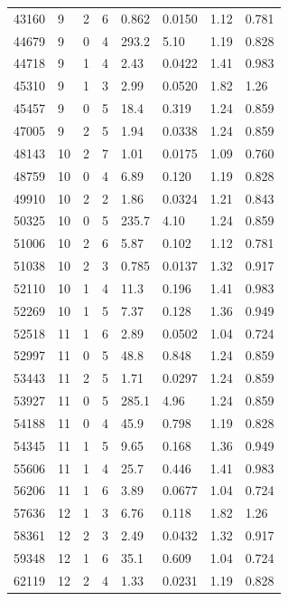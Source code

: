 \documentclass[preview]{standalone}
\begin{document}
{{{\begin{tabular}{L{1.2cm}C{1.2cm} C{0.3cm}C{0.5cm} C{1.4cm}C{1.4cm} C{1.4cm}C{1.4cm}}
  43160  &     9  & 2     &  6 &  0.862  & 0.0150  & 1.12 &  0.781   \\ 
  44679  &     9  & 0     &  4 &  293.2  & 5.10  & 1.19 &  0.828   \\ 
  44718  &     9  & 1     &  4 &  2.43  & 0.0422  & 1.41 &  0.983   \\ 
  45310  &     9  & 1     &  3 &  2.99  & 0.0520  & 1.82 &  1.26   \\ 
  45457  &     9  & 0     &  5 &  18.4  & 0.319  & 1.24 &  0.859   \\ 
  47005  &     9  & 2     &  5 &  1.94  & 0.0338  & 1.24 &  0.859   \\ 
  48143  &    10  & 2     &  7 &  1.01  & 0.0175  & 1.09 &  0.760   \\ 
  48759  &    10  & 0     &  4 &  6.89  & 0.120  & 1.19 &  0.828   \\ 
  49910  &    10  & 2     &  2 &  1.86  & 0.0324  & 1.21 &  0.843   \\ 
  50325  &    10  & 0     &  5 &  235.7  & 4.10  & 1.24 &  0.859   \\ 
  51006  &    10  & 2     &  6 &  5.87  & 0.102  & 1.12 &  0.781   \\ 
  51038  &    10  & 2     &  3 &  0.785  & 0.0137  & 1.32 &  0.917   \\ 
  52110  &    10  & 1     &  4 &  11.3  & 0.196  & 1.41 &  0.983   \\ 
  52269  &    10  & 1     &  5 &  7.37  & 0.128  & 1.36 &  0.949   \\ 
  52518  &    11  & 1     &  6 &  2.89  & 0.0502  & 1.04 &  0.724   \\ 
  52997  &    11  & 0     &  5 &  48.8  & 0.848  & 1.24 &  0.859   \\ 
  53443  &    11  & 2     &  5 &  1.71  & 0.0297  & 1.24 &  0.859   \\ 
  53927  &    11  & 0     &  5 &  285.1  & 4.96  & 1.24 &  0.859   \\ 
  54188  &    11  & 0     &  4 &  45.9  & 0.798  & 1.19 &  0.828   \\ 
  54345  &    11  & 1     &  5 &  9.65  & 0.168  & 1.36 &  0.949   \\ 
  55606  &    11  & 1     &  4 &  25.7  & 0.446  & 1.41 &  0.983   \\ 
  56206  &    11  & 1     &  6 &  3.89  & 0.0677  & 1.04 &  0.724   \\ 
  57636  &    12  & 1     &  3 &  6.76  & 0.118  & 1.82 &  1.26   \\ 
  58361  &    12  & 2     &  3 &  2.49  & 0.0432  & 1.32 &  0.917   \\ 
  59348  &    12  & 1     &  6 &  35.1  & 0.609  & 1.04 &  0.724   \\ 
  62119  &    12  & 2     &  4 &  1.33  & 0.0231  & 1.19 &  0.828   \\ 
\hline 
\end{tabular} 

}}}
\end{document}
